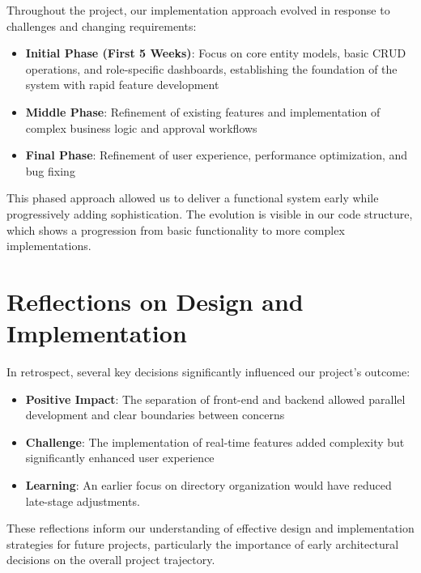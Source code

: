 Throughout the project, our implementation approach evolved in response to challenges 
and changing requirements:

\begin{itemize}
    \item \textbf{Initial Phase (First 5 Weeks)}: Focus on core entity models, basic 
    CRUD operations, and role-specific dashboards, establishing the foundation of the 
    system with rapid feature development
    \item \textbf{Middle Phase}: Refinement of existing features and implementation of 
    complex business logic and approval workflows
    \item \textbf{Final Phase}: Refinement of user experience, performance optimization, 
    and bug fixing
\end{itemize}

This phased approach allowed us to deliver a functional system early while progressively 
adding sophistication. The evolution is visible in our code structure, which shows a 
progression from basic functionality to more complex implementations.

\section{Reflections on Design and Implementation}

In retrospect, several key decisions significantly influenced our project's outcome:

\begin{itemize}
    \item \textbf{Positive Impact}: The separation of front-end and backend allowed 
    parallel development and clear boundaries between concerns
    \item \textbf{Challenge}: The implementation of real-time features added complexity 
    but significantly enhanced user experience
    \item \textbf{Learning}: An earlier focus on directory organization would have 
    reduced late-stage adjustments.
\end{itemize}

These reflections inform our understanding of effective design and implementation 
strategies for future projects, particularly the importance of early architectural 
decisions on the overall project trajectory.